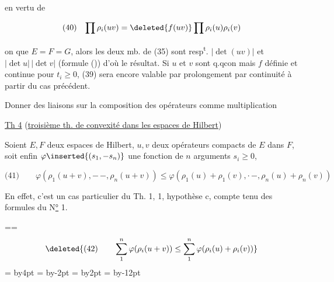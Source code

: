 en vertu de

\[
\begin{array}{ll}(40)&\displaystyle\prod\rho_i(uv)=\deleted{f(uv)}\prod\rho_i(u)\rho_i(v)\end{array}
\]

  on    que $E=F=G$, alors les deux mb. de (35) sont resp\textsuperscript{t}. $|\det(uv)|$ et $|\det u|\,|\det v|$ (formule ()) d'où le résultat. Si $u$ et $v$ sont q.qcon mais $f$ définie et continue pour $t_i\geq0$, (39) sera encore valable par prolongement par continuité à partir du cas précédent.

Donner des liaisons sur la composition des opérateurs comme multiplication

\reversemarginpar{}\normalmarginpar


\uline{Th 4} (\uline{troisième th. de convexité dans les espaces de Hilbert})

\reversemarginpar
{}
\normalmarginpar
Soient $E,F$ deux espaces de Hilbert, $u,v$ deux opérateurs compacts de $E$ dans $F$, soit enfin $\varphi\inserted{(s_1,\mathord{-}s_n)}$ une fonction  de $n$ arguments $s_i\geq0$, 

\[
\text{(41)}\qquad
\varphi(\rho_1(u+v),\mathord{-}\,\mathord{-},\rho_n(u+v))\leq
\varphi(\rho_1(u)+\rho_1(v),\mathord{\cdot}\,\mathord{-},\rho_n(u)+\rho_n(v))
\]

En effet, c'est un cas particulier du Th. 1, 1, hypothèse c, compte tenu des formules du N\uline{°} 1.

\begingroup
{}=\vbox{\hsize=\linewidth
\noindent{}
\[
\deleted{\text{(42)}\qquad\sum_1^n\varphi(\rho_i(u+v))\leq\sum_1^n\varphi(\rho_i(u)+\rho_i(v))}
\]}
=\advance{} by4pt
=\advance{} by-2pt
=\advance{} by2pt
=\advance{} by-12pt
\noindent{}
\endgroup

